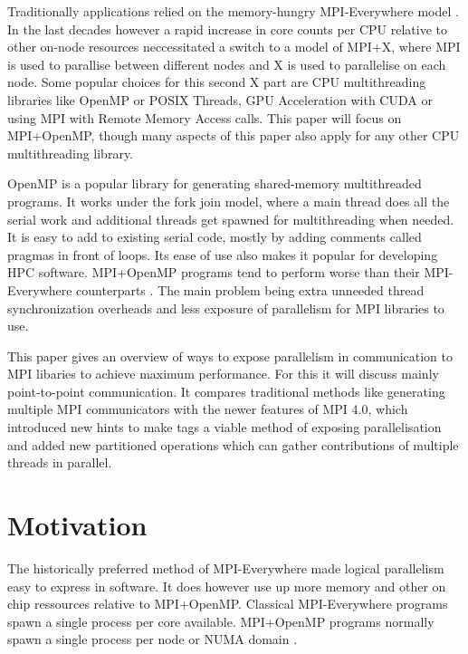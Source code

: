 \documentclass[sigconf]{acmart}
\begin{document}
Traditionally applications relied on the memory-hungry MPI-Everywhere model \cite{zambreLessonsLearned2022}.
In the last decades however a rapid increase in core counts per CPU relative to other on-node resources neccessitated a switch to a model of MPI+X,
where MPI is used to parallise between different nodes and X is used to parallelise on each node.
Some popular choices for this second X part are CPU multithreading libraries like OpenMP or POSIX Threads, GPU Acceleration with CUDA or using MPI with Remote Memory Access calls.
This paper will focus on MPI+OpenMP, though many aspects of this paper also apply for any other CPU multithreading library.

OpenMP is a popular library for generating shared-memory multithreaded programs.
It works under the fork join model, where a main thread does all the serial work and additional threads get spawned for multithreading when needed.
It is easy to add to existing serial code, mostly by adding comments called pragmas in front of loops.
Its ease of use also makes it popular for developing HPC software.
MPI+OpenMP programs tend to perform worse than their MPI-Everywhere counterparts \cite{zambreLessonsLearned2022}\cite{zambreLogicalParallel2021}.
The main problem being extra unneeded thread synchronization overheads \cite{zambreLessonsLearned2022} and less exposure of parallelism for MPI libraries to use.

This paper gives an overview of ways to expose parallelism in communication to MPI libaries to achieve maximum performance.
For this it will discuss mainly point-to-point communication. It compares traditional methods like generating multiple MPI communicators with the newer features of MPI 4.0, which introduced new hints to make tags a viable method of exposing parallelisation and added new partitioned operations which can gather contributions of multiple threads in parallel.

\section{Motivation}
The historically preferred method of MPI-Everywhere made logical parallelism easy to express in software.
It does however use up more memory and other on chip ressources relative to MPI+OpenMP.
Classical MPI-Everywhere programs spawn a single process per core available.
MPI+OpenMP programs normally spawn a single process per node or NUMA domain \cite{zambreLessonsLearned2022}.
\end{document}
